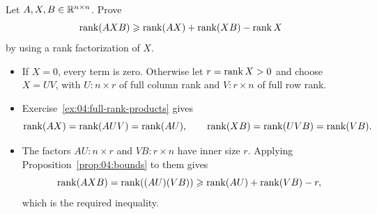 \begin{problem}\label{ex:04:factor-frobenius}
Let \(A,X,B\in\mathbb R^{n\times n}\). Prove
\[
\operatorname{rank}(AXB)\geqslant\operatorname{rank}(AX)+\operatorname{rank}(XB)-\operatorname{rank} X
\]
by using a rank factorization of \(X\).
\end{problem}
\begin{solution}
\begin{itemize}
\item If \(X=0\), every term is zero. Otherwise let \(r=\operatorname{rank} X>0\)
and choose \(X=UV\), with \(U:n\times r\) of full column rank
and \(V:r\times n\) of full row rank.
\item Exercise~\ref{ex:04:full-rank-products} gives
\[
\operatorname{rank}(AX)=\operatorname{rank}(AUV)=\operatorname{rank}(AU),\qquad
\operatorname{rank}(XB)=\operatorname{rank}(UVB)=\operatorname{rank}(VB).
\]
\item The factors \(AU:n\times r\) and \(VB:r\times n\) have inner size \(r\).
Applying Proposition~\ref{prop:04:bounds} to them gives
\[
\operatorname{rank}(AXB)=\operatorname{rank}((AU)(VB))
\geqslant\operatorname{rank}(AU)+\operatorname{rank}(VB)-r,
\]
which is the required inequality.
\end{itemize}
\end{solution}

